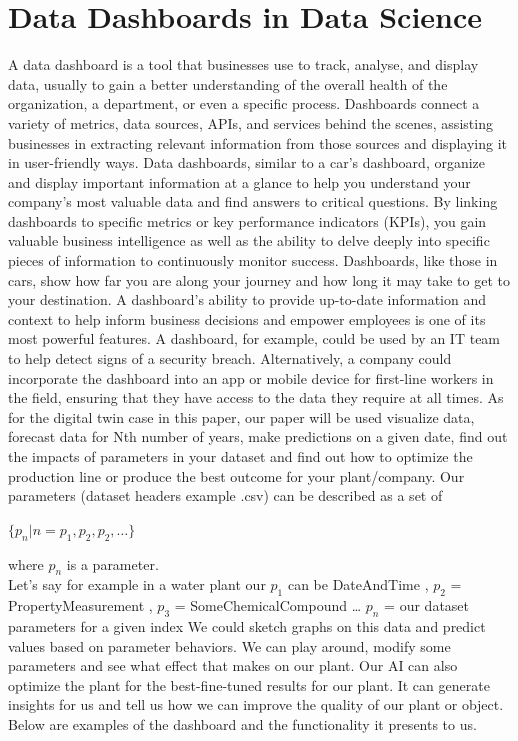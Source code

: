 \section{Data Dashboards in Data Science}
A data dashboard is a tool that businesses use to track, analyse, and display data, usually to gain a better understanding of the overall health of the organization, a department, or even a specific process. Dashboards connect a variety of metrics, data sources, APIs, and services behind the scenes, assisting businesses in extracting relevant information from those sources and displaying it in user-friendly ways. Data dashboards, similar to a car's dashboard, organize and display important information at a glance to help you understand your company's most valuable data and find answers to critical questions. By linking dashboards to specific metrics or key performance indicators (KPIs), you gain valuable business intelligence as well as the ability to delve deeply into specific pieces of information to continuously monitor success. Dashboards, like those in cars, show how far you are along your journey and how long it may take to get to your destination.
A dashboard's ability to provide up-to-date information and context to help inform business decisions and empower employees is one of its most powerful features. A dashboard, for example, could be used by an IT team to help detect signs of a security breach. Alternatively, a company could incorporate the dashboard into an app or mobile device for first-line workers in the field, ensuring that they have access to the data they require at all times.
As for the digital twin case in this paper, our paper will be used visualize data, forecast data for Nth number of years, make predictions on a given date, find out the impacts of parameters in your dataset and find out how to optimize the production line or produce the best outcome for your plant/company.
Our parameters (dataset headers example .csv) can be described as a set of

\begin{center}
    $\{p_n | n=p_1,p_2,p_2,\dots\}$
\end{center}

where $p_n$ is a parameter.\\


Let’s say for example in a water plant our $p_1$ can be DateAndTime , $p_2$ = PropertyMeasurement , $p_3$ = SomeChemicalCompound … $p_n$ = our dataset parameters for a given index
We could sketch graphs on this data and predict values based on parameter behaviors. We can play around, modify some parameters and see what effect that makes on our plant. Our AI can also optimize the plant for the best-fine-tuned results for our plant. It can generate insights for us and tell us how we can improve the quality of our plant or object. Below are examples of the dashboard and the functionality it presents to us.

